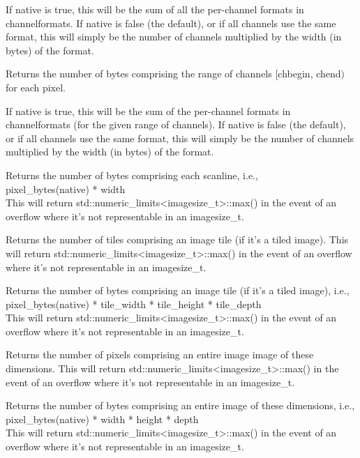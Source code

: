 If {\cf native} is true, this will be the sum of all the per-channel
formats in {\cf channelformats}.  If {\cf native} is false (the
default), or if all channels use the same format, this will simply be
the number of channels multiplied by the width (in bytes) of the {\cf format}.
\apiend

Returns the number of bytes comprising the range of channels 
  $[${\cf chbegin}, {\cf chend}$)$ for each pixel.

If {\cf native} is true, this will be the sum of the per-channel
formats in {\cf channelformats} (for the given range of channels).  
If {\cf native} is false (the
default), or if all channels use the same format, this will simply be
the number of channels multiplied by the width (in bytes) of the {\cf format}.
\apiend

Returns the number of bytes comprising each scanline,
i.e., \\ {\cf pixel_bytes(native) * width} \\
This will return {\cf std::numeric_limits<imagesize_t>::max()} in the event
of an overflow where it's not representable in an {\cf imagesize_t}.
\apiend

Returns the number of tiles comprising an image tile (if it's a tiled image).
This will return {\cf std::numeric_limits<imagesize_t>::max()} in the event
of an overflow where it's not representable in an {\cf imagesize_t}.
\apiend

Returns the number of bytes comprising an image tile (if it's a tiled
image), i.e., \\ {\cf pixel_bytes(native) * tile_width * tile_height * tile_depth } \\
This will return {\cf std::numeric_limits<imagesize_t>::max()} in the event
of an overflow where it's not representable in an {\cf imagesize_t}.
\apiend

Returns the number of pixels comprising an entire image image of these dimensions.
This will return {\cf std::numeric_limits<imagesize_t>::max()} in the event
of an overflow where it's not representable in an {\cf imagesize_t}.
\apiend

Returns the number of bytes comprising an entire image of these
dimensions, i.e., \\
{\cf pixel_bytes(native) * width * height * depth } \\
This will return {\cf std::numeric_limits<imagesize_t>::max()} in the event
of an overflow where it's not representable in an {\cf imagesize_t}.
\apiend

